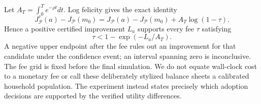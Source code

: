 Let $A_T=\int_0^T e^{-\rho t}dt$. Log felicity gives the exact identity
\begin{equation}\label{eq:r12fee}
 J_{\mathcal P}^{\tau}(a)-J_{\mathcal P}(m_0)
 =J_{\mathcal P}(a)-J_{\mathcal P}(m_0)+A_T\log(1-\tau).
\end{equation}
Hence a positive certified improvement $L_a$ supports every fee $\tau$ satisfying
\[
 \tau<1-\exp(-L_a/A_T).
\]
 A negative upper endpoint after the fee rules out an improvement for that candidate under the confidence event; an interval spanning zero is inconclusive. The fee grid is fixed before the final simulation. We do not equate wall-clock cost to a monetary fee or call these deliberately stylized balance sheets a calibrated household population. The experiment instead states precisely which adoption decisions are supported by the verified utility differences.

